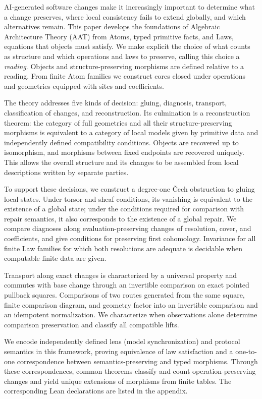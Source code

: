 AI-generated software changes make it increasingly important to determine what
a change preserves, where local consistency fails to extend globally, and which
alternatives remain. This paper develops the foundations of Algebraic
Architecture Theory (AAT) from Atoms, typed primitive facts, and Laws, equations
that objects must satisfy. We make explicit the choice of what counts as
structure and which operations and laws to preserve, calling this choice a
\emph{reading}. Objects and structure-preserving morphisms are defined relative
to a reading. From finite Atom families we construct cores closed under
operations and geometries equipped with sites and coefficients.

The theory addresses five kinds of decision: gluing, diagnosis, transport,
classification of changes, and reconstruction. Its culmination is a
reconstruction theorem: the category of full geometries and all their
structure-preserving morphisms is equivalent to a category of local models
given by primitive data and independently defined compatibility conditions.
Objects are recovered up to isomorphism, and morphisms between fixed endpoints
are recovered uniquely. This allows the overall structure and its changes to
be assembled from local descriptions written by separate parties.

To support these decisions, we construct a degree-one \v{C}ech obstruction to
gluing local states. Under torsor and sheaf conditions, its vanishing is
equivalent to the existence of a global state; under the conditions required
for comparison with repair semantics, it also corresponds to the existence of
a global repair. We compare diagnoses along evaluation-preserving changes of
resolution, cover, and coefficients, and give conditions for preserving first
cohomology. Invariance for all finite Law families for which both resolutions are
adequate is decidable when computable finite data are given.

Transport along exact changes is characterized by a universal property and
commutes with base change through an invertible comparison on exact pointed
pullback squares. Comparisons of two routes generated from the same square,
finite comparison diagram, and geometry factor into an invertible comparison
and an idempotent normalization. We characterize when observations alone
determine comparison preservation and classify all compatible lifts.

We encode independently defined lens (model synchronization) and protocol
semantics in this framework, proving equivalence of law satisfaction and a
one-to-one correspondence between semantics-preserving and typed morphisms.
Through these correspondences, common theorems classify and count operation-preserving
changes and yield unique extensions of morphisms from finite tables. The
corresponding Lean declarations are listed in the appendix.
